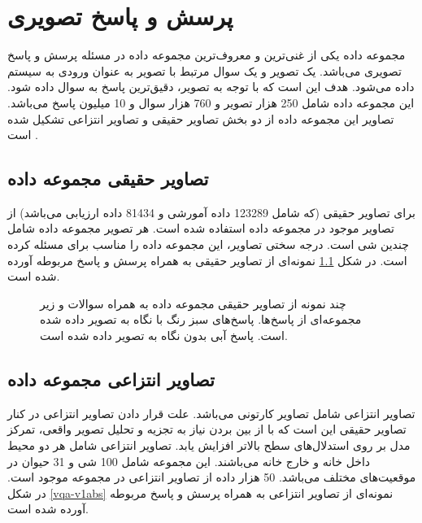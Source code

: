 \chapter{پرسش و پاسخ تصویری}
\thispagestyle{empty}

مجموعه داده
\href{https://visualqa.org/vqa_v1_download.html}{}
یکی از غنی‌ترین و معروف‌‌ترین مجموعه داده در مسئله پرسش و پاسخ تصویری می‌باشد. یک تصویر و یک سوال مرتبط با تصویر به عنوان ورودی به سیستم داده می‌شود. هدف این است که با توجه به تصویر، دقیق‌ترین پاسخ به سوال داده شود. این مجموعه داده شامل 250 هزار تصویر و 760 هزار سوال و 10 میلیون پاسخ می‌باشد. تصاویر این مجموعه داده از دو بخش تصاویر حقیقی
و تصاویر انتزاعی
تشکیل شده است  \cite{antol2015vqa}.
\section{تصاویر حقیقی مجموعه داده
	}
برای تصاویر حقیقی (که شامل 123289 داده آمورشی و 81434 داده ارزیابی می‌باشد) از تصاویر موجود در مجموعه داده  
  \cite{lin2015microsoft}
استفاده شده است. هر تصویر مجموعه داده 
شامل چندین شی است. درجه سختی تصاویر، این مجموعه داده را مناسب برای مسئله  
کرده است. در شکل \ref{vqa-v1real} نمونه‌ای از تصاویر حقیقی به همراه پرسش و پاسخ مربوطه آورده شده است.

\begin{figure}
	\caption{چند نمونه از تصاویر حقیقی مجموعه داده  
	به همراه سوالات و زیر مجموعه‌ای از پاسخ‌ها. پاسخ‌های سبز رنگ با نگاه به تصویر داده شده است. پاسخ آبی بدون نگاه به تصویر داده شده است.  \cite{antol2015vqa}}
	\label{vqa-v1real}
\end{figure}

\section{تصاویر انتزاعی مجموعه داده
	}
تصاویر انتزاعی شامل تصاویر کارتونی می‌باشد. علت قرار دادن تصاویر انتزاعی در کنار تصاویر حقیقی این است که با از بین بردن نیاز به تجزیه و تحلیل تصویر واقعی، تمرکز مدل بر روی استدلال‌های سطح بالاتر افزایش یابد. تصاویر انتزاعی شامل هر دو محیط داخل خانه و خارج خانه می‌باشند. این مجموعه شامل 100 شی و 31 حیوان در موقعیت‌های مختلف می‌باشد. 50 هزار داده از تصاویر انتزاعی در مجموعه 
موجود است. در شکل \ref{vqa-v1abs} نمونه‌ای از تصاویر انتزاعی به همراه پرسش و پاسخ مربوطه آورده شده است.


